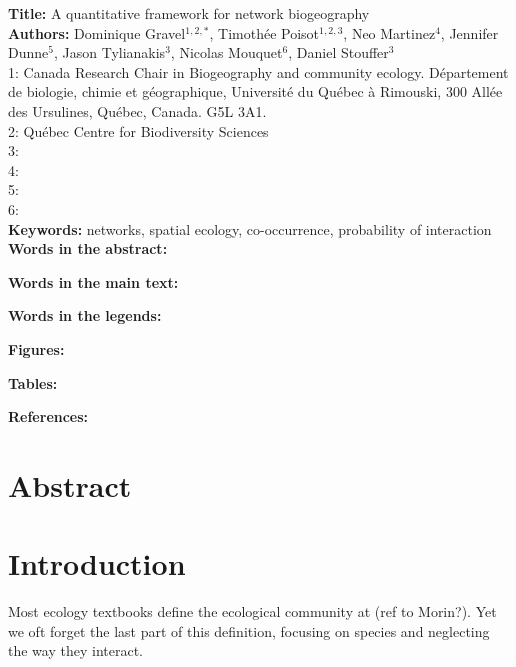 \documentclass[12pt]{article}
\begin{document}
\linenumbers 
\modulolinenumbers[1]

\textbf{Title:} A quantitative framework for network biogeography\\

\textbf{Authors:} Dominique Gravel$^{1,2,*}$, Timoth\'ee Poisot$^{1,2,3}$, Neo
Martinez$^{4}$, Jennifer Dunne$^{5}$, Jason Tylianakis$^{3}$, Nicolas
Mouquet$^{6}$, Daniel Stouffer$^{3}$ \\

1: Canada Research Chair in Biogeography and community ecology. D\'epartement de
biologie, chimie et g\'eographique, Universit\'e du Qu\'ebec \`a Rimouski, 300
All\'ee des Ursulines, Qu\'ebec, Canada. G5L 3A1.\\

2: Qu\'ebec Centre for Biodiversity Sciences\\

3: \\

4: \\

5: \\

6:\\

\textbf{Keywords:} networks, spatial ecology, co-occurrence, probability of interaction\\

\textbf{Words in the abstract:}  

\textbf{Words in the main text:}  

\textbf{Words in the legends:}   

\textbf{Figures:} 

\textbf{Tables:}         

\textbf{References:} 

\newpage
\doublespacing

\section*{Abstract} 

\newpage
\section*{Introduction}

Most ecology textbooks define the ecological community at  (ref to Morin?). Yet we oft forget the last part of this
definition, focusing on species and neglecting the way they interact.
\end{document}

